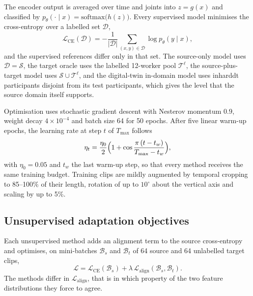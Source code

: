 \documentclass[Royal,sagev,times]{sagej}
\begin{document}
The encoder output is averaged over time and joints into $z=g(x)$ and
classified by $p_\theta(\cdot\mid x)=\mathrm{softmax}\bigl(h(z)\bigr)$. Every
supervised model minimises the cross-entropy over a labelled set $\mathcal{D}$,
\begin{equation}
  \mathcal{L}_{\mathrm{CE}}(\mathcal{D})=-\frac{1}{|\mathcal{D}|}
  \sum_{(x,y)\in\mathcal{D}}\log p_\theta(y\mid x),
  \label{eq:ce}
\end{equation}
and the supervised references differ only in that set. The source-only model
uses $\mathcal{D}=\mathcal{S}$, the target oracle uses the labelled 12-worker
pool $\mathcal{T}^{\ell}$, the source-plus-target model uses
$\mathcal{S}\cup\mathcal{T}^{\ell}$, and the digital-twin in-domain model uses
\acs{inharddt} participants disjoint from its test participants, which gives
the level that the source domain itself supports.

Optimisation uses stochastic gradient descent with Nesterov momentum $0.9$,
weight decay $4\times10^{-4}$ and batch size 64 for 50 epochs. After five
linear warm-up epochs, the learning rate at step $t$ of $T_{\max}$ follows
\begin{equation}
  \eta_t=\frac{\eta_0}{2}\Bigl(1+\cos\frac{\pi\,(t-t_w)}{T_{\max}-t_w}\Bigr),
  \label{eq:lr}
\end{equation}
with $\eta_0=0.05$ and $t_w$ the last warm-up step, so that every method
receives the same training budget. Training clips are mildly augmented by
temporal cropping to 85--100\% of their length, rotation of up to $10^\circ$
about the vertical axis and scaling by up to 5\%.

\subsection{Unsupervised adaptation objectives}

Each unsupervised method adds an alignment term to the source cross-entropy and
optimises, on mini-batches $\mathcal{B}_s$ and $\mathcal{B}_t$ of 64 source and
64 unlabelled target clips,
\begin{equation}
  \mathcal{L}=\mathcal{L}_{\mathrm{CE}}(\mathcal{B}_s)
  +\lambda\,\mathcal{L}_{\mathrm{align}}(\mathcal{B}_s,\mathcal{B}_t).
  \label{eq:uda}
\end{equation}
The methods differ in $\mathcal{L}_{\mathrm{align}}$, that is in which property
of the two feature distributions they force to agree.
\end{document}
